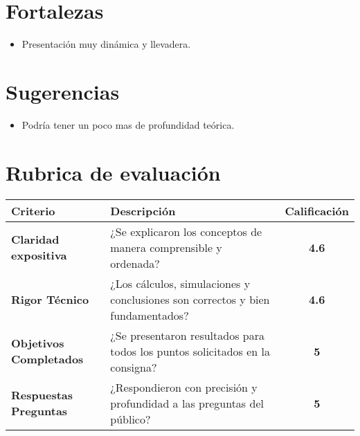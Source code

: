 \documentclass[]{informeutn}
\begin{document}
      \section{Fortalezas}
        \begin{itemize}
            \item Presentación muy dinámica y llevadera.
        \end{itemize}
      \section{Sugerencias}
        \begin{itemize}
            \item Podría tener un poco mas de profundidad teórica.
        \end{itemize}
      \section{Rubrica de evaluación}
        \begin{table}[!ht]
          \centering
          \begin{tabular}{|p{4.5cm}|p{7.5cm}|c|}
            \hline
            \textbf{Criterio} & \textbf{Descripción} & \textbf{Calificación} \\ \hline
            \textbf{Claridad expositiva} & ¿Se explicaron los conceptos de manera comprensible y ordenada? & \textbf{4.6} \\ \hline
            \textbf{Rigor Técnico} & ¿Los cálculos, simulaciones y conclusiones son correctos y bien fundamentados? & \textbf{4.6} \\ \hline
            \textbf{Objetivos Completados} & ¿Se presentaron resultados para todos los puntos solicitados en la consigna? & \textbf{5} \\ \hline
            \textbf{Respuestas Preguntas} & ¿Respondieron con precisión y profundidad a las preguntas del público? & \textbf{5} \\ \hline
          \end{tabular}
        \end{table}
\end{document}
